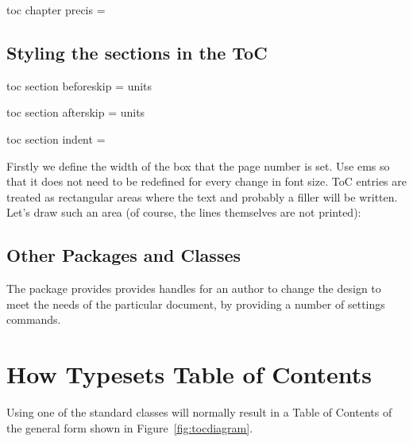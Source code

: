 \begin{docKey}[phd]{toc chapter precis} { = }{}
\end{docKey}

\section{Styling the sections in the ToC}

\begin{docKey}[phd]{toc section beforeskip}{ = }{units}
\end{docKey}
\begin{docKey}[phd]{toc section afterskip}{ = }{units}
\end{docKey}
\begin{docKey}[phd]{toc section indent}{ = }{}
\end{docKey}


Firstly we define the width of the box that the page number is set. Use ems so that it does not need to be redefined for every change in font size.
ToC entries are treated as rectangular areas where the text
and probably a filler will be written. Let's draw such an
area (of course, the lines themselves are not printed):



\section{Other Packages and Classes}
The package  provides  provides handles for an author to change the design to meet the needs of the particular document, by providing a number of settings commands.



\chapter{How \latexe Typesets Table of Contents}

Using one of the standard \latexe classes will normally result in a Table of Contents of the general form shown in Figure~\ref{fig:tocdiagram}.

 \newcommand{\maxx}{120}       %
 \newcommand{\maxxm}{118}      %
 \newcommand{\maxy}{55}        %
 \newcommand{\maxym}{53}       %
 \newcommand{\findent}{20}     %
 \newcommand{\findentp}{22}    %
 \newcommand{\fnumwidth}{10}   %
 \newcommand{\ftocrmarg}{30}   %
 \newcommand{\fpnumwidth}{20}  %
 \newcommand{\fipn}{30}        %
 \newcommand{\frmarg}{90}      %
 \newcommand{\frnum}{100}      %
 \newcommand{\fyi}{10}         %
 \newcommand{\fyim}{8}         %
 \newcommand{\fyii}{20}        %
 \newcommand{\fyiii}{25}       %
 \newcommand{\fyiv}{30}        %
 \newcommand{\fyv}{40}         %
 \newcommand{\fyvp}{42}        %
 \newcommand{\flin}{4}         %
 \newcommand{\frmargm}{89}     %
 
